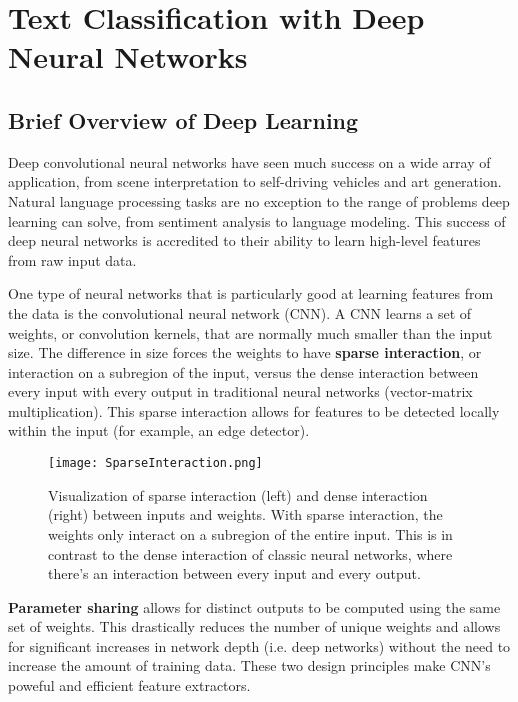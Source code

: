 
\chapter{Text Classification with Deep Neural Networks}\label{TXT-CLASS}

\section{Brief Overview of Deep Learning}
Deep convolutional neural networks have seen much success on a wide
array of application, from scene interpretation to self-driving vehicles and art generation.
Natural language processing tasks are no exception to the range of problems
deep learning can solve, from sentiment analysis to language modeling. This success of deep neural networks
is accredited to their ability to learn high-level features from raw input data\cite{le2013building}.

One type of neural networks that is particularly good at learning features from the data is the convolutional neural network (CNN)\cite{dosovitskiy2014discriminative}\cite{lecun1989backpropagation}\cite{oquab2014learning}.
A CNN learns a set of weights, or convolution kernels, that are normally much smaller than the input size.
The difference in size forces the weights to have \textbf{sparse interaction}, or interaction on a subregion of the input, versus the dense interaction
between every input with every output in traditional neural networks (vector-matrix multiplication). This sparse interaction
allows for features to be detected locally within the input (for example, an edge detector).
\begin{figure}[H]
\centering
\texttt{[image: SparseInteraction.png]}
\caption{Visualization of sparse interaction (left) and dense interaction (right) between inputs and weights. With sparse interaction, the weights only
interact on a subregion of the entire input. This is in contrast to the dense interaction of classic neural networks, where there's an interaction between every
input and every output.}
\end{figure}
\textbf{Parameter sharing} allows for distinct outputs to be computed using the same set of weights. This drastically reduces
the number of unique weights and allows for significant increases in network depth (i.e. deep networks) without the need
to increase the amount of training data.
These two design principles make CNN's poweful and efficient feature extractors.

